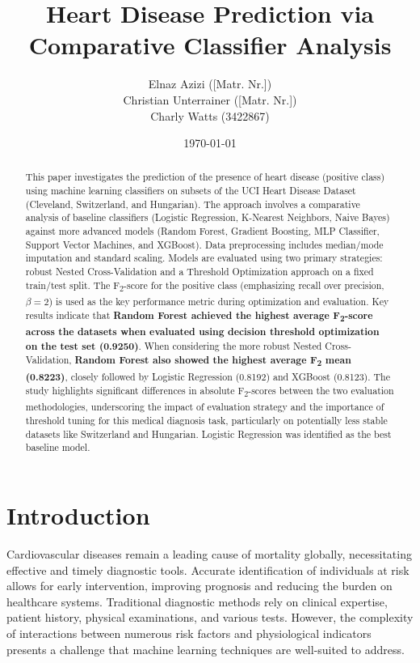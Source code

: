\documentclass{article}
\title{Heart Disease Prediction via Comparative Classifier Analysis}
\author{
    Elnaz Azizi ([Matr. Nr.]) \\ %
    Christian Unterrainer ([Matr. Nr.])\\ %
    Charly Watts (3422867)
}
\date{\today}
\begin{document}
\maketitle

\begin{abstract}
This paper investigates the prediction of the presence of heart disease (positive class) using machine learning classifiers on subsets of the UCI Heart Disease Dataset (Cleveland, Switzerland, and Hungarian). The approach involves a comparative analysis of baseline classifiers (Logistic Regression, K-Nearest Neighbors, Naive Bayes) against more advanced models (Random Forest, Gradient Boosting, MLP Classifier, Support Vector Machines, and XGBoost). Data preprocessing includes median/mode imputation and standard scaling. Models are evaluated using two primary strategies: robust Nested Cross-Validation and a Threshold Optimization approach on a fixed train/test split. The F\textsubscript{2}-score for the positive class (emphasizing recall over precision, $\beta=2$) is used as the key performance metric during optimization and evaluation. Key results indicate that \textbf{Random Forest achieved the highest average F\textsubscript{2}-score across the datasets when evaluated using decision threshold optimization on the test set (0.9250)}. When considering the more robust Nested Cross-Validation, \textbf{Random Forest also showed the highest average F\textsubscript{2} mean (0.8223)}, closely followed by Logistic Regression (0.8192) and XGBoost (0.8123). The study highlights significant differences in absolute F\textsubscript{2}-scores between the two evaluation methodologies, underscoring the impact of evaluation strategy and the importance of threshold tuning for this medical diagnosis task, particularly on potentially less stable datasets like Switzerland and Hungarian. Logistic Regression was identified as the best baseline model.
\end{abstract}

\section{Introduction}
\label{sec:introduction}

Cardiovascular diseases remain a leading cause of mortality globally, necessitating effective and timely diagnostic tools. Accurate identification of individuals at risk allows for early intervention, improving prognosis and reducing the burden on healthcare systems. Traditional diagnostic methods rely on clinical expertise, patient history, physical examinations, and various tests. However, the complexity of interactions between numerous risk factors and physiological indicators presents a challenge that machine learning techniques are well-suited to address.
\end{document}
